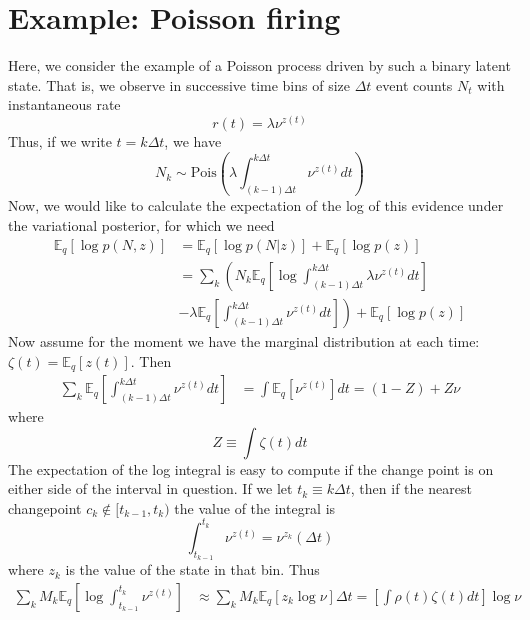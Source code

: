\documentclass[11pt]{article}
\begin{document}
\section{Example: Poisson firing}
Here, we consider the example of a Poisson process driven by such a binary latent state. That is, we observe in successive time bins of size $\Delta t$ event counts $N_t$ with instantaneous rate
\begin{equation}
    r(t) = \lambda \nu^{z(t)}
\end{equation}
Thus, if we write $t = k\Delta t$, we have
\begin{equation}
    N_k \sim \text{Pois}\left(\lambda \int_{(k - 1)\Delta t}^{k\Delta t} \nu^{z(t)} dt\right)
\end{equation}
Now, we would like to calculate the expectation of the log of this evidence under the variational posterior, for which we need
\begin{align}
    \mathbb{E}_q[\log p(N, z)] &= \mathbb{E}_q[\log p(N|z)] + \mathbb{E}_q[\log p(z)] \\
    &= \sum_k \left(N_k \mathbb{E}_q \left[ \log \int_{(k - 1)\Delta t}^{k\Delta t} \lambda \nu^{z(t)} dt \right] \right. \\
    &- \left.\lambda \mathbb{E}_q\left[ \int_{(k - 1)\Delta t}^{k\Delta t} \nu^{z(t)} dt\right]\right)
    + \mathbb{E}_q[\log p(z)]
\end{align}
Now assume for the moment we have the marginal distribution at each time: $\zeta(t) = \mathbb{E}_q[z(t)]$. Then
\begin{align}
    \sum_k \mathbb{E}_q\left[ \int_{(k - 1)\Delta t}^{k\Delta t} \nu^{z(t)} dt\right] &= \int \mathbb{E}_q \left[\nu^{z(t)}\right] dt = (1 - Z) + Z\nu
\end{align}
where
\begin{equation}
    Z \equiv \int \zeta(t) dt
\end{equation}
The expectation of the log integral is easy to compute if the change point is on either side of the interval in question. If we let $t_k \equiv k \Delta t$, then if the nearest changepoint $c_k \notin [t_{k -1}, t_k)$ the value of the integral is
\begin{equation}
    \int_{t_{k - 1}}^{t_k} \nu^{z(t)} = \nu^{z_k}(\Delta t)
\end{equation}
where $z_k$ is the value of the state in that bin. Thus
\begin{align}
    \sum_k M_k \mathbb{E}_q \left[
    \log \int_{t_{k - 1}}^{t_k} \nu^{z(t)}
    \right]
    &\approx \sum_k M_k \mathbb{E}_q \left[z_k \log \nu \right] \Delta t = \left[\int \rho(t) \zeta(t) dt \right] \log \nu
\end{align}
\end{document}
